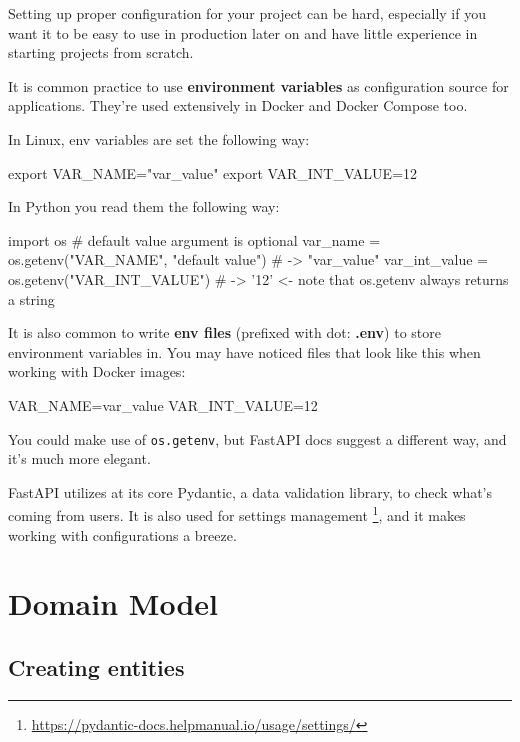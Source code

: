 \documentclass[14pt]{extarticle}
\newcommand{\flink}[1]{\footnote{\href{#1}{#1}}}
\newcommand{\pyinline}[1]{\lstinline[language=Python, style=cstyle, morekeywords={async}, basicstyle=\ttfamily\normalsize]{#1}}
\begin{document}
Setting up proper configuration for your project can be hard, especially if you want it to be easy to use in production later on and have little experience in starting projects from scratch.

It is common practice to use \textbf{environment variables} as configuration source for applications. They're used extensively in Docker and Docker Compose too.

In Linux, env variables are set the following way:

\begin{bashcode}
    export VAR_NAME="var_value"
    export VAR_INT_VALUE=12
\end{bashcode}

In Python you read them the following way:

\begin{pycode}
    import os
    # default value argument is optional
    var_name = os.getenv("VAR_NAME", "default value") # -> "var_value"
    var_int_value = os.getenv("VAR_INT_VALUE") # -> '12' <- note that os.getenv always returns a string
\end{pycode}

It is also common to write \textbf{env files} (prefixed with dot: \textbf{.env}) to store environment variables in. You may have noticed files that look like this when working with Docker images:

\begin{bashcode}
    VAR_NAME=var_value
    VAR_INT_VALUE=12
\end{bashcode}

You could make use of \pyinline{os.getenv}, but FastAPI docs suggest a different way, and it's much more elegant.

FastAPI utilizes at its core Pydantic, a data validation library, to check what's coming from users. It is also used for settings management \flink{https://pydantic-docs.helpmanual.io/usage/settings/}, and it makes working with configurations a breeze.

\section{Domain Model}

\subsection{Creating entities}
\end{document}
